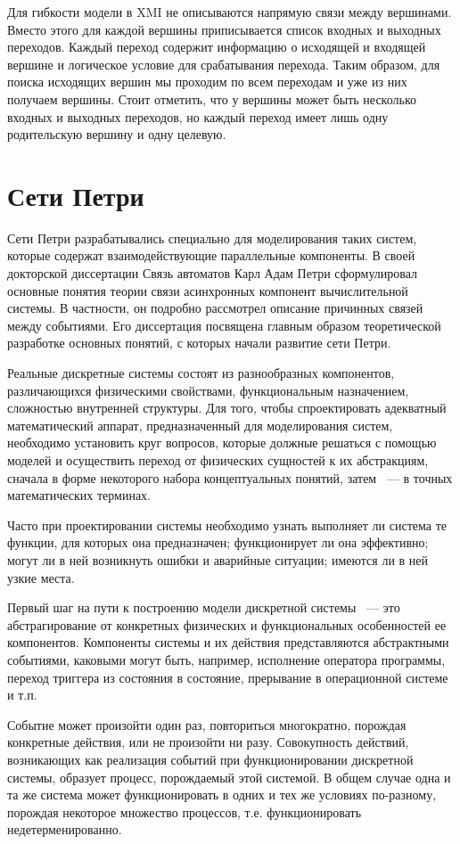 Для гибкости модели в XMI не описываются напрямую связи между вершинами. Вместо этого для каждой вершины приписывается список входных и выходных переходов. Каждый переход содержит информацию о исходящей и входящей вершине и логическое условие для срабатывания перехода. Таким образом, для поиска исходящих вершин мы проходим по всем переходам и уже из них получаем вершины. Стоит отметить, что у вершины может быть несколько входных и выходных переходов, но каждый переход имеет лишь одну родительскую вершину и одну целевую.

\section{Сети Петри}

Сети Петри разрабатывались специально для моделирования таких систем, которые содержат взаимодействующие параллельные компоненты. В своей докторской диссертации Связь автоматов Карл Адам Петри сформулировал основные понятия теории связи асинхронных компонент вычислительной системы. В частности, он подробно рассмотрел описание причинных связей между событиями. Его диссертация посвящена главным образом теоретической разработке основных понятий, с которых начали развитие сети Петри. \cite{Kotov}

Реальные дискретные системы состоят из разнообразных компонентов, различающихся физическими свойствами, функциональным назначением, сложностью внутренней структуры. Для того, чтобы спроектировать адекватный математический аппарат, предназначенный для моделирования систем, необходимо установить круг вопросов, которые должные решаться с помощью моделей и осуществить переход от физических сущностей к их абстракциям, сначала в форме некоторого набора концептуальных понятий, затем ~--- в точных математических терминах.

Часто при проектировании системы необходимо узнать выполняет ли система те функции, для которых она предназначен; функционирует ли она эффективно; могут ли в ней возникнуть ошибки и аварийные ситуации; имеются ли в ней узкие места.

Первый шаг на пути к построению модели дискретной системы ~--- это абстрагирование от конкретных физических и функциональных особенностей ее компонентов. Компоненты системы и их действия представляются абстрактными событиями, каковыми могут быть, например, исполнение оператора программы, переход триггера из состояния в состояние, прерывание в операционной системе и т.п.

Событие может произойти один раз, повториться многократно, порождая конкретные действия, или не произойти ни разу. Совокупность действий, возникающих как реализация событий при функционировании дискретной системы, образует процесс, порождаемый этой системой. В общем случае одна и та же система может функционировать в одних и тех же условиях по-разному, порождая некоторое множество процессов, т.е. функционировать недетерменированно.

